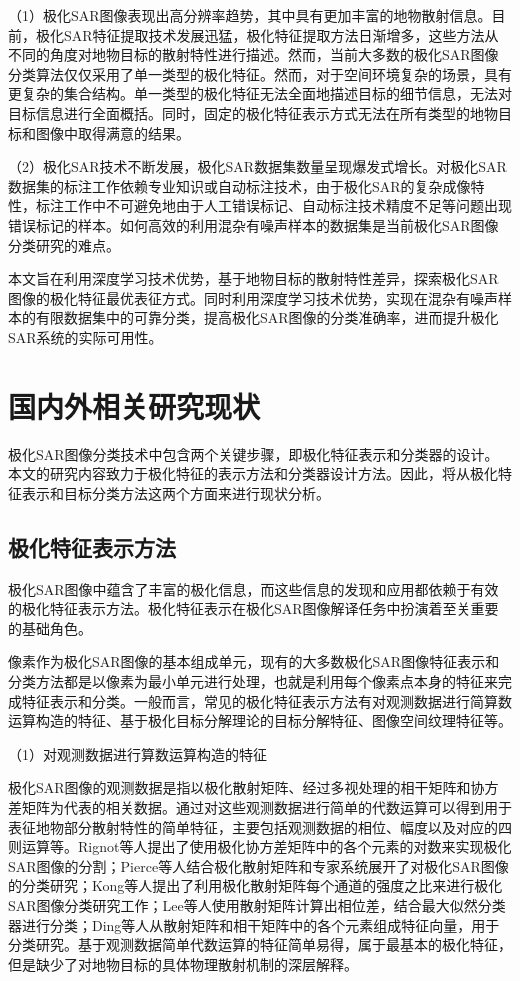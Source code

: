 （1）极化SAR图像表现出高分辨率趋势，其中具有更加丰富的地物散射信息。目前，极化SAR特征提取技术发展迅猛，极化特征提取方法日渐增多，这些方法从不同的角度对地物目标的散射特性进行描述。然而，当前大多数的极化SAR图像分类算法仅仅采用了单一类型的极化特征。然而，对于空间环境复杂的场景，具有更复杂的集合结构。单一类型的极化特征无法全面地描述目标的细节信息，无法对目标信息进行全面概括。同时，固定的极化特征表示方式无法在所有类型的地物目标和图像中取得满意的结果。

（2）极化SAR技术不断发展，极化SAR数据集数量呈现爆发式增长。对极化SAR数据集的标注工作依赖专业知识或自动标注技术，由于极化SAR的复杂成像特性，标注工作中不可避免地由于人工错误标记、自动标注技术精度不足等问题出现错误标记的样本。如何高效的利用混杂有噪声样本的数据集是当前极化SAR图像分类研究的难点。

本文旨在利用深度学习技术优势，基于地物目标的散射特性差异，探索极化SAR图像的极化特征最优表征方式。同时利用深度学习技术优势，实现在混杂有噪声样本的有限数据集中的可靠分类，提高极化SAR图像的分类准确率，进而提升极化SAR系统的实际可用性。

\section{国内外相关研究现状}
极化SAR图像分类技术中包含两个关键步骤，即极化特征表示和分类器的设计。本文的研究内容致力于极化特征的表示方法和分类器设计方法。因此，将从极化特征表示和目标分类方法这两个方面来进行现状分析。

\subsection{极化特征表示方法}
极化SAR图像中蕴含了丰富的极化信息，而这些信息的发现和应用都依赖于有效的极化特征表示方法。极化特征表示在极化SAR图像解译任务中扮演着至关重要的基础角色。

像素作为极化SAR图像的基本组成单元，现有的大多数极化SAR图像特征表示和分类方法都是以像素为最小单元进行处理，也就是利用每个像素点本身的特征来完成特征表示和分类。一般而言，常见的极化特征表示方法有对观测数据进行简算数运算构造的特征、基于极化目标分解理论的目标分解特征、图像空间纹理特征等。

（1）对观测数据进行算数运算构造的特征

极化SAR图像的观测数据是指以极化散射矩阵、经过多视处理的相干矩阵和协方差矩阵为代表的相关数据。通过对这些观测数据进行简单的代数运算可以得到用于表征地物部分散射特性的简单特征，主要包括观测数据的相位、幅度以及对应的四则运算等。Rignot等人提出了使用极化协方差矩阵中的各个元素的对数来实现极化SAR图像的分割；Pierce等人结合极化散射矩阵和专家系统展开了对极化SAR图像的分类研究；Kong等人提出了利用极化散射矩阵每个通道的强度之比来进行极化SAR图像分类研究工作；Lee等人使用散射矩阵计算出相位差，结合最大似然分类器进行分类；Ding等人从散射矩阵和相干矩阵中的各个元素组成特征向量，用于分类研究。基于观测数据简单代数运算的特征简单易得，属于最基本的极化特征，但是缺少了对地物目标的具体物理散射机制的深层解释。

